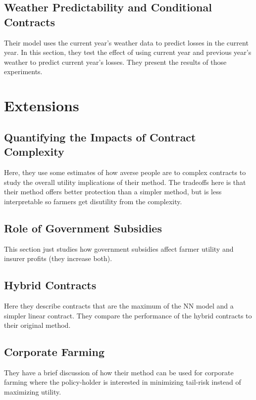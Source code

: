 \documentclass[11pt]{article}
\begin{document}
  \subsection{Weather Predictability and Conditional Contracts}
    Their model uses the current year's weather data to predict losses in the current year. In this section, they test the effect of using current year and previous year's weather to predict current year's losses. They present the results of those experiments. 

\section{Extensions}
  \subsection{Quantifying the Impacts of Contract Complexity}
    Here, they use some estimates of how averse people are to complex contracts to study the overall utility implications of their method. The tradeoffs here is that their method offers better protection than a simpler method, but is less interpretable so farmers get disutility from the complexity.
  \subsection{Role of Government Subsidies}
    This section just studies how government subsidies affect farmer utility and insurer profits (they increase both).
  \subsection{Hybrid Contracts}
    Here they describe contracts that are the maximum of the NN model and a simpler linear contract. They compare the performance of the hybrid contracts to their original method. 
  \subsection{Corporate Farming}
    They have a brief discussion of how their method can be used for corporate farming where the policy-holder is interested in minimizing tail-risk instead of maximizing utility. 
    
\end{document}

